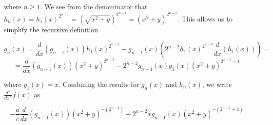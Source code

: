 ﻿\documentclass{article}
\begin{document}
where $n \geq 1$. We see from the denominator that $h_n(x) = h_1(x)^{2^{n-1}} = (\sqrt{x^2 + y})^{2^{n - 1}} = (x^2 + y)^{2^{n - 2}}$. This allows us to simplify the \href{https://en.wikipedia.org/wiki/Recursive_definition}{recursive definition}

\begin{equation*}
     g_n(x) = \frac{d}{dx} (g_{n - 1}(x)) h_1(x)^{2^{n - 2}} - g_{n - 1}(x) (2^{n - 2} h_1(x)^{2^{n - 3}} \frac{d}{dx} (h_1(x))) =
\end{equation*}
\begin{equation*}
    = \frac{d}{dx} (g_{n - 1}(x)) (x^2 + y)^{2^{n - 3}} - 2^{n - 2} g_{n - 1}(x) g_1(x) (x^2 + y)^{2^{n - 3} - 1}
\end{equation*}

where $g_1(x) = x$. Combining the results for $g_n(x)$ and $h_n(x)$, we write $\frac{d^n}{dx^n} f(x)$ as

\begin{equation*}
    - \frac{a}{c} \frac{d}{dx} (g_{n - 1}(x)) (x^2 + y)^{- (2^{n - 3})} - 2^{n - 2} x g_{n - 1}(x) (x^2 + y)^{-(2^{n - 3} + 1)}
\end{equation*}
\end{document}
